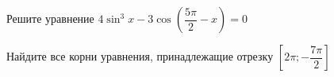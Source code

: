 \begin{ex}
	\begin{condition}
		\begin{enumcols}[label=\asbuk*)]
			\item Решите уравнение \( 4\sin^3 x - 3\cos{\left(\dfrac{5\pi}{2}-x\right)}= 0 \)
			\item Найдите все корни уравнения, принадлежащие отрезку \( \left[2\pi;-\dfrac{7\pi}{2}\right] \)
		\end{enumcols}
	\end{condition}
\end{ex}